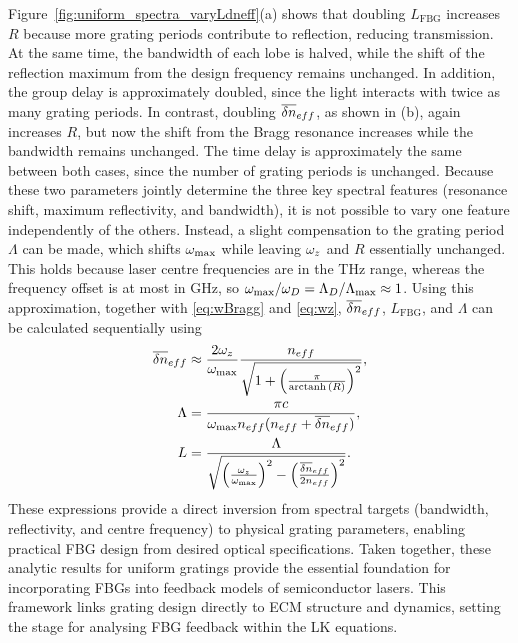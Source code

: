 %
\par
%
Figure~\ref{fig:uniform_spectra_varyLdneff}(a) shows that doubling $L_\text{FBG}$ increases $R$ because more grating periods contribute to reflection, reducing transmission.
At the same time, the bandwidth of each lobe is halved, while the shift of the reflection maximum from the design frequency remains unchanged.
In addition, the group delay is approximately doubled, since the light interacts with twice as many grating periods.
In contrast, doubling $\overline{\delta n}_{eff}$, as shown in (b), again increases $R$, but now the shift from the Bragg resonance increases while the bandwidth remains unchanged.
The time delay is approximately the same between both cases, since the number of grating periods is unchanged.
Because these two parameters jointly determine the three key spectral features (resonance shift, maximum reflectivity, and bandwidth), it is not possible to vary one feature independently of the others.
Instead, a slight compensation to the grating period $\Lambda$ can be made, which shifts $\omega_\text{max}$ while leaving $\omega_z$ and $R$ essentially unchanged.
This holds because laser centre frequencies are in the THz range, whereas the frequency offset is at most in GHz, so $\omega_\text{max}/\omega_D = \Lambda_D/\Lambda_\text{max} \approx 1$.
Using this approximation, together with \eqref{eq:wBragg} and \eqref{eq:wz}, $\overline{\delta n}_{eff}$, $L_\text{FBG}$, and $\Lambda$ can be calculated sequentially using
%
\begin{align}
\label{eq:spec2phys}
    \overline{\delta n}_{eff} &\approx \frac{2\omega_z}{\omega_\text{max}} \frac{n_{eff}}{\sqrt{1 + \left(\frac{\pi}{\operatorname{arctanh}{(R)}} \right)^2}},
    \\
    \Lambda &= \frac{\pi c}{\omega_\text{max} n_{eff} (n_{eff} +\overline{\delta n}_{eff})},
    \\
    L &= \frac{\Lambda}{\sqrt{\left( \frac{\omega_z}{\omega_\text{max}} \right)^2 - \left( \frac{\overline{\delta n}_{eff}}{2n_{eff}} \right)^2}}.
\end{align}
%
These expressions provide a direct inversion from spectral targets (bandwidth, reflectivity, and centre frequency) to physical grating parameters, enabling practical FBG design from desired optical specifications.
Taken together, these analytic results for uniform gratings provide the essential foundation for incorporating FBGs into feedback models of semiconductor lasers.
This framework links grating design directly to ECM structure and dynamics, setting the stage for analysing FBG feedback within the LK equations.
%
%

